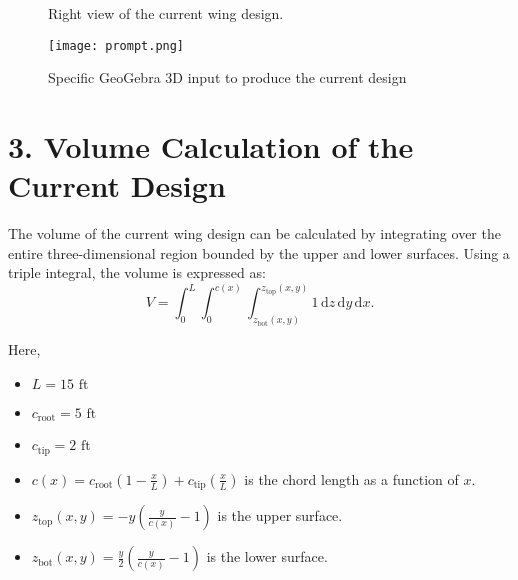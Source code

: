 \documentclass[12pt]{article}
\begin{document}
\begin{figure}[H]
    \centering
    \caption{Right view of the current wing design.}
\end{figure}

\begin{figure}[H]
    \centering
    \texttt{[image: prompt.png]}
    \caption{Specific GeoGebra 3D input to produce the current design}
    \label{fig:4}
\end{figure}




\section*{3. Volume Calculation of the Current Design}
The volume of the current wing design can be calculated by integrating over the entire three-dimensional region bounded by the upper and lower surfaces. Using a triple integral, the volume is expressed as:
\[
V = \int_{0}^L \int_{0}^{c(x)} \int_{z_{\text{bot}}(x, y)}^{z_{\text{top}}(x, y)} 1 \, \mathrm{d}z \, \mathrm{d}y \, \mathrm{d}x.
\]

Here, 
\begin{itemize}
    \item \( L = 15 \text{ ft} \) 
    \item \( c_{\text{root}} = 5 \text{ ft}\)
    \item \( c_{\text{tip}} = 2 \text{ ft}\)
    \item \( c(x) = c_{\text{root}} \left( 1 - \frac{x}{L} \right) + c_{\text{tip}} \left( \frac{x}{L} \right) \) is the chord length as a function of \( x \).
    \item \( z_{\text{top}}(x, y) = -y \left( \frac{y}{c(x)} - 1 \right) \) is the upper surface.
    \item \( z_{\text{bot}}(x, y) = \frac{y}{2} \left( \frac{y}{c(x)} - 1 \right) \) is the lower surface.
\end{itemize}
\end{document}
